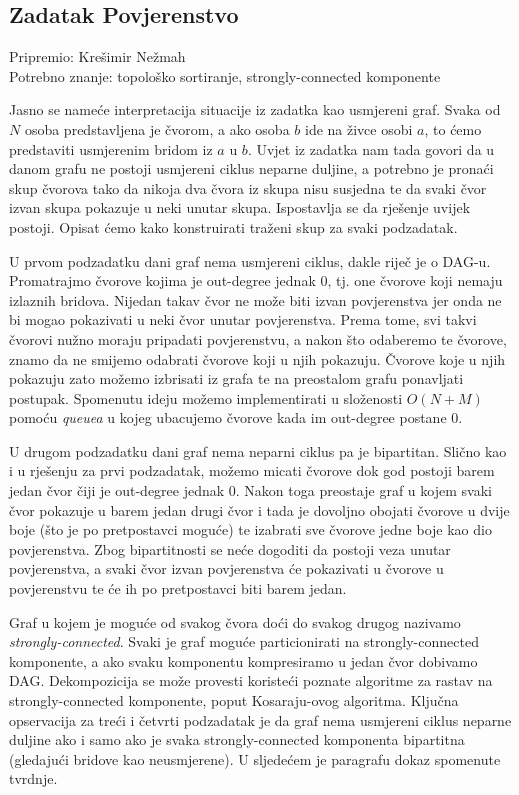 \subsection*{Zadatak Povjerenstvo}
\textsf{Pripremio: Krešimir Nežmah}\\
\textsf{Potrebno znanje: topološko sortiranje, strongly-connected komponente}

Jasno se nameće interpretacija situacije iz zadatka kao usmjereni graf. Svaka od $N$ osoba predstavljena je čvorom, a ako osoba $b$ ide na živce osobi $a$, to ćemo predstaviti usmjerenim bridom iz $a$ u $b$. Uvjet iz zadatka nam tada govori da u danom grafu ne postoji usmjereni ciklus neparne duljine, a potrebno je pronaći skup čvorova tako da nikoja dva čvora iz skupa nisu susjedna te da svaki čvor izvan skupa pokazuje u neki unutar skupa. Ispostavlja se da rješenje uvijek postoji. Opisat ćemo kako konstruirati traženi skup za svaki podzadatak.

U prvom podzadatku dani graf nema usmjereni ciklus, dakle riječ je o DAG-u. Promatrajmo čvorove kojima je out-degree jednak 0, tj. one čvorove koji nemaju izlaznih bridova. Nijedan takav čvor ne može biti izvan povjerenstva jer onda ne bi mogao pokazivati u neki čvor unutar povjerenstva. Prema tome, svi takvi čvorovi nužno moraju pripadati povjerenstvu, a nakon što odaberemo te čvorove, znamo da ne smijemo odabrati čvorove koji u njih pokazuju. Čvorove koje u njih pokazuju zato možemo izbrisati iz grafa te na preostalom grafu ponavljati postupak. Spomenutu ideju možemo implementirati u složenosti $O(N + M)$ pomoću \textit{queuea} u kojeg ubacujemo čvorove kada im out-degree postane 0.

U drugom podzadatku dani graf nema neparni ciklus pa je bipartitan. Slično kao i u rješenju za prvi podzadatak, možemo micati čvorove dok god postoji barem jedan čvor čiji je out-degree jednak 0. Nakon toga preostaje graf u kojem svaki čvor pokazuje u barem jedan drugi čvor i tada je dovoljno obojati čvorove u dvije boje (što je po pretpostavci moguće) te izabrati sve čvorove jedne boje kao dio povjerenstva. Zbog bipartitnosti se neće dogoditi da postoji veza unutar povjerenstva, a svaki čvor izvan povjerenstva će pokazivati u čvorove u povjerenstvu te će ih po pretpostavci biti barem jedan.

Graf u kojem je moguće od svakog čvora doći do svakog drugog nazivamo \textit{strongly-connected}. Svaki je graf moguće particionirati na strongly-connected komponente, a ako svaku komponentu kompresiramo u jedan čvor dobivamo DAG. Dekompozicija se može provesti koristeći poznate algoritme za rastav na strongly-connected komponente, poput Kosaraju-ovog algoritma. Ključna opservacija za treći i četvrti podzadatak je da graf nema usmjereni ciklus neparne duljine ako i samo ako je svaka strongly-connected komponenta bipartitna (gledajući bridove kao neusmjerene). U sljedećem je paragrafu dokaz spomenute tvrdnje.


